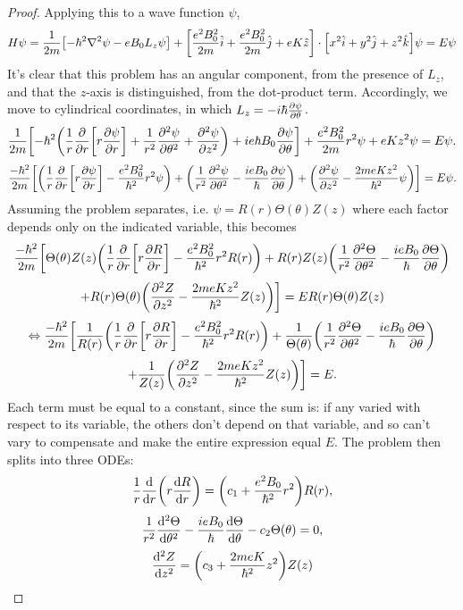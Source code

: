 \documentclass{article}
\begin{document}
\begin{proof}
  Applying this to a wave function $\psi$,
  \[
    H\psi = \frac{1}{2m}\qty[-\hbar^{2}\laplacian{\psi} - eB_{0}L_{z}\psi] + \qty[\frac{e^{2}B_{0}^{2}}{2m}\hat{i}
    + \frac{e^{2}B_{0}^{2}}{2m}\hat{j} + eK\hat{z}] \cdot \qty[x^{2}\hat{i} + y^{2}\hat{j} + z^{2}\hat{k}]\psi = E\psi
  \]
  It's clear that this problem has an angular component, from the presence of $L_{z}$, and that the $z$-axis is distinguished,
  from the dot-product term.
  Accordingly, we move to cylindrical coordinates, in which $L_{z} = -i\hbar\pdv{\psi}{\theta}$.
  \[
    \frac{1}{2m}\qty[-\hbar^{2}\qty(\frac{1}{r}\pdv{r}\qty[r\pdv{\psi}{r}] + \frac{1}{r^{2}}\pdv[2]{\psi}{\theta} + \pdv[2]{\psi}{z})
    + ie\hbar B_{0}\pdv{\psi}{\theta}] + \frac{e^{2}B_{0}^{2}}{2m}r^{2}\psi + eKz^{2}\psi = E\psi.
  \]
  \[
    \frac{-\hbar^{2}}{2m}\qty[\qty(\frac{1}{r}\pdv{r}\qty[r\pdv{\psi}{r}] - \frac{e^{2}B_{0}^{2}}{\hbar^{2}}r^{2}\psi)
    + \qty(\frac{1}{r^{2}}\pdv[2]{\psi}{\theta} -\frac{ieB_{0}}{\hbar}\pdv{\psi}{\theta})
    + \qty(\pdv[2]{\psi}{z} - \frac{2meKz^{2}}{\hbar^{2}}\psi)]  = E\psi.
  \]
  Assuming the problem separates, i.e. $\psi = R(r)\Theta(\theta)Z(z)$ where each factor depends only on the indicated variable, this becomes
  \[
    \frac{-\hbar^{2}}{2m}\bigg[\Theta(\theta)Z(z)\qty(\frac{1}{r}\pdv{r}\qty[r\pdv{R}{r}] - \frac{e^{2}B_{0}^{2}}{\hbar^{2}}r^{2}R(r))
    + R(r)Z(z)\qty(\frac{1}{r^{2}}\pdv[2]{\Theta}{\theta} -\frac{ieB_{0}}{\hbar}\pdv{\Theta}{\theta})
  \]
  \[
    + R(r)\Theta(\theta)\qty(\pdv[2]{Z}{z} - \frac{2meKz^{2}}{\hbar^{2}}Z(z))\bigg]  = ER(r)\Theta(\theta)Z(z)
  \]
  \[
    \Leftrightarrow
    \frac{-\hbar^{2}}{2m}\bigg[\frac{1}{R(r)}\qty(\frac{1}{r}\pdv{r}\qty[r\pdv{R}{r}] - \frac{e^{2}B_{0}^{2}}{\hbar^{2}}r^{2}R(r))
    + \frac{1}{\Theta(\theta)}\qty(\frac{1}{r^{2}}\pdv[2]{\Theta}{\theta} -\frac{ieB_{0}}{\hbar}\pdv{\Theta}{\theta})
  \]
  \[
    + \frac{1}{Z(z)}\qty(\pdv[2]{Z}{z} - \frac{2meKz^{2}}{\hbar^{2}}Z(z))\bigg]  = E.
  \]
  Each term must be equal to a constant, since the sum is: if any varied with respect to its variable, the others don't depend on that variable,
  and so can't vary to compensate and make the entire expression equal $E$.
  The problem then splits into three ODEs:
  \[
    \frac{1}{r}\dv{r}\qty(r\dv{R}{r}) = \qty(c_{1} + \frac{e^{2}B_{0}}{\hbar^{2}}r^{2})R(r),
  \]
  \[
    \frac{1}{r^{2}}\dv[2]{\Theta}{\theta} - \frac{ieB_{0}}{\hbar}\dv{\Theta}{\theta} - c_{2}\Theta(\theta) = 0,
  \]
  \[
    \dv[2]{Z}{z} = \qty(c_{3} + \frac{2meK}{\hbar^{2}}z^{2})Z(z)
  \]
\end{proof}
\end{document}
